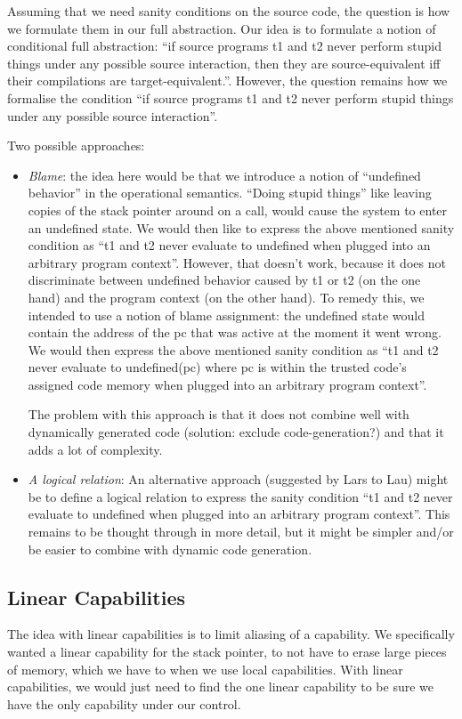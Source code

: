 \documentclass[a4paper]{article}
\begin{document}
Assuming that we need sanity conditions on the source code, the question is how we formulate them in our full abstraction.
Our idea is to formulate a notion of conditional full abstraction: ``if source programs t1 and t2 never perform stupid things under any possible source interaction, then they are source-equivalent iff their compilations are target-equivalent.''.
However, the question remains how we formalise the condition ``if source programs t1 and t2 never perform stupid things under any possible source interaction''.

Two possible approaches:
\begin{itemize}
\item \emph{Blame}: the idea here would be that we introduce a notion of ``undefined behavior'' in the operational semantics.
  ``Doing stupid things'' like leaving copies of the stack pointer around on a call, would cause the system to enter an undefined state.
  We would then like to express the above mentioned sanity condition as ``t1 and t2 never evaluate to undefined when plugged into an arbitrary program context''.
  However, that doesn't work, because it does not discriminate between undefined behavior caused by t1 or t2 (on the one hand) and the program context (on the other hand).
  To remedy this, we intended to use a notion of blame assignment: the undefined state would contain the address of the pc that was active at the moment it went wrong.
  We would then express the above mentioned sanity condition as ``t1 and t2 never evaluate to undefined(pc) where pc is within the trusted code's assigned code memory when plugged into an arbitrary program context''.

  The problem with this approach is that it does not combine well with dynamically generated code (solution: exclude code-generation?) and that it adds a lot of complexity.

\item \emph{A logical relation}: An alternative approach (suggested by Lars to Lau) might be to define a logical relation to express the sanity condition ``t1 and t2 never evaluate to undefined when plugged into an arbitrary program context''.
  This remains to be thought through in more detail, but it might be simpler and/or be easier to combine with dynamic code generation.
\end{itemize}

\subsection{Linear Capabilities}
\label{sec:linear-cap}
The idea with linear capabilities is to limit aliasing of a capability. We specifically wanted a linear capability for the stack pointer, to not have to erase large pieces of memory, which we have to when we use local capabilities. With linear capabilities, we would just need to find the one linear capability to be sure we have the only capability under our control.
\end{document}
